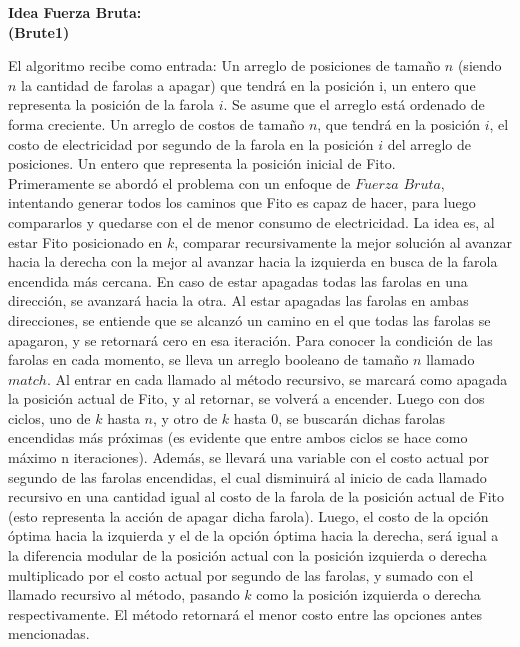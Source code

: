 \documentclass[10pt,letterpaper]{article}
\begin{document}
{ 	{\Large \bf Idea Fuerza Bruta:}\\
 	
 	{\small \bf (Brute1)}
 	
 	El algoritmo recibe como entrada: Un arreglo de posiciones de tama\~no $n$ (siendo $n$ la cantidad de farolas a apagar) que tendr\'a en la posici\'on i, un entero que representa la posici\'on de la farola $i$. Se asume que el arreglo est\'a ordenado de forma creciente. Un arreglo de costos de tama\~no $n$, que tendr\'a en la posici\'on $i$, el costo de electricidad por segundo de la farola en la posici\'on $i$ del arreglo de posiciones. Un entero que representa la posici\'on inicial de Fito.\\
 	
 	Primeramente se abord\'o el problema con un enfoque de $Fuerza$ $Bruta$, intentando generar todos los caminos que Fito es capaz de hacer, para luego compararlos y quedarse con el de menor consumo de electricidad. La idea es, al estar Fito posicionado en $k$, comparar recursivamente la mejor soluci\'on al avanzar hacia la derecha con la mejor al avanzar hacia la izquierda en busca de la farola encendida m\'as cercana. En caso de estar apagadas todas las farolas en una direcci\'on, se avanzar\'a hacia la otra. Al estar apagadas las farolas en ambas direcciones, se entiende que se alcanz\'o un camino en el que todas las farolas se apagaron, y se retornar\'a cero en esa iteraci\'on. Para conocer la condici\'on de las farolas en cada momento, se lleva un arreglo booleano de tama\~no $n$ llamado $match$. Al entrar en cada llamado al m\'etodo recursivo, se marcar\'a como apagada la posici\'on actual de Fito, y al retornar, se volver\'a a encender. Luego con dos ciclos, uno de $k$ hasta $n$, y otro de $k$ hasta $0$, se buscar\'an dichas farolas encendidas m\'as pr\'oximas (es evidente que entre ambos ciclos se hace como m\'aximo n iteraciones). Adem\'as, se llevar\'a una variable con el costo actual por segundo de las farolas encendidas, el cual disminuir\'a al inicio de cada llamado recursivo en una cantidad igual al costo de la farola de la posici\'on actual de Fito (esto representa la acci\'on de apagar dicha farola). Luego, el costo de la opci\'on \'optima hacia la izquierda y el de la opci\'on \'optima hacia la derecha, ser\'a igual a la diferencia modular de la posici\'on actual con la posici\'on izquierda o derecha multiplicado por el costo actual por segundo de las farolas, y sumado con el llamado recursivo al m\'etodo, pasando $k$ como la posici\'on izquierda o derecha respectivamente. El m\'etodo retornar\'a el menor costo entre las opciones antes mencionadas.
 	
}
\end{document}
